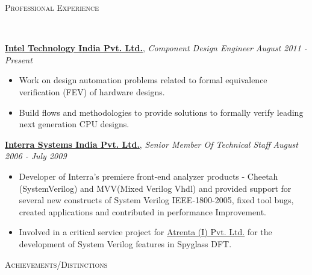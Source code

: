 \documentclass[9pt]{article}
\newenvironment{changemargin}[2]{%
  \begin{list}{}{%
    \setlength{\topsep}{0pt}%
    \setlength{\leftmargin}{#1}%
    \setlength{\rightmargin}{#2}%
    \setlength{\listparindent}{\parindent}%
    \setlength{\itemindent}{\parindent}%
    \setlength{\parsep}{\parskip}%
  }%
  \item[]}{\end{list}
}
\newcommand{\lineover}{
	\begin{changemargin}{-0.05in}{-0.05in}
		\vspace*{-8pt}
		\hrulefill \\
		\vspace*{-2pt}
	\end{changemargin}
}
\newcommand{\header}[1]{
	\begin{changemargin}{-0.5in}{-0.5in}
		\scshape{#1}\\
  	\lineover
	\end{changemargin}
}
\newenvironment{body} {
	\vspace*{-16pt}
	\begin{changemargin}{-0.25in}{-0.5in}
  }	
	{\end{changemargin}
}
\begin{document}
\header{Professional Experience}

\begin{body}
	\vspace{14pt}
	\href{http://www.intel.in/content/www/in/en/homepage.html}{\textbf{Intel Technology India Pvt. Ltd.}}, \emph{Component Design Engineer} \hfill \emph{August 2011 - Present}\\
	\vspace*{-4pt}
	\begin{itemize} \itemsep -0pt  %
		\item Work on design automation problems related to formal equivalence verification (FEV) of hardware designs.
		\item Build flows and methodologies to provide solutions to formally verify leading next generation CPU designs.
	\end{itemize}

	\href{http://www.interrasystems.com/}{\textbf {Interra Systems India Pvt. Ltd.}}, \emph{Senior Member Of Technical Staff} \hfill \emph{August 2006 - July 2009}\\
	\vspace*{-4pt}
	\begin{itemize} \itemsep -0pt
		\item Developer of Interra's premiere front-end analyzer products - Cheetah (SystemVerilog) and MVV(Mixed Verilog Vhdl) and 
		provided support for several new constructs of System Verilog IEEE-1800-2005, fixed tool bugs, created applications and contributed in performance Improvement. 		
		\item Involved in a critical service project for \href{http://www.atrenta.com/}{Atrenta (I) Pvt. Ltd.} for the development of System Verilog features in Spyglass DFT.
	\end{itemize}
\end{body}

\smallskip

\header{Achievements/Distinctions}
\end{document}
